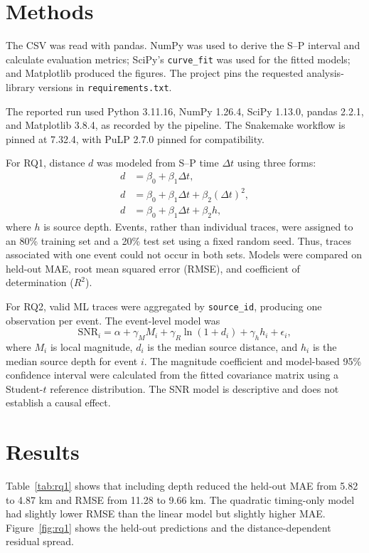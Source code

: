 \documentclass[sigconf,nonacm]{acmart}
\begin{document}
\section{Methods}
The CSV was read with pandas. NumPy was used to derive the S--P interval and calculate evaluation metrics; SciPy's \texttt{curve\_fit} was used for the fitted models; and Matplotlib produced the figures. The project pins the requested analysis-library versions in \texttt{requirements.txt}.

The reported run used Python 3.11.16, NumPy 1.26.4, SciPy 1.13.0, pandas 2.2.1, and Matplotlib 3.8.4, as recorded by the pipeline. The Snakemake workflow is pinned at 7.32.4, with PuLP 2.7.0 pinned for compatibility.

For RQ1, distance $d$ was modeled from S--P time $\Delta t$ using three forms:
\begin{align}
 d &= \beta_0 + \beta_1\Delta t, \\
 d &= \beta_0 + \beta_1\Delta t + \beta_2(\Delta t)^2, \\
 d &= \beta_0 + \beta_1\Delta t + \beta_2 h,
\end{align}
where $h$ is source depth. Events, rather than individual traces, were assigned to an 80\% training set and a 20\% test set using a fixed random seed. Thus, traces associated with one event could not occur in both sets. Models were compared on held-out MAE, root mean squared error (RMSE), and coefficient of determination ($R^2$).

For RQ2, valid ML traces were aggregated by \texttt{source\_id}, producing one observation per event. The event-level model was
\begin{equation}
 \mathrm{SNR}_i = \alpha + \gamma_M M_i + \gamma_R\ln(1+d_i) + \gamma_h h_i + \epsilon_i,
\end{equation}
where $M_i$ is local magnitude, $d_i$ is the median source distance, and $h_i$ is the median source depth for event $i$. The magnitude coefficient and model-based 95\% confidence interval were calculated from the fitted covariance matrix using a Student-$t$ reference distribution. The SNR model is descriptive and does not establish a causal effect.

\section{Results}
Table~\ref{tab:rq1} shows that including depth reduced the held-out MAE from 5.82 to 4.87 km and RMSE from 11.28 to 9.66 km. The quadratic timing-only model had slightly lower RMSE than the linear model but slightly higher MAE. Figure~\ref{fig:rq1} shows the held-out predictions and the distance-dependent residual spread.
\end{document}
